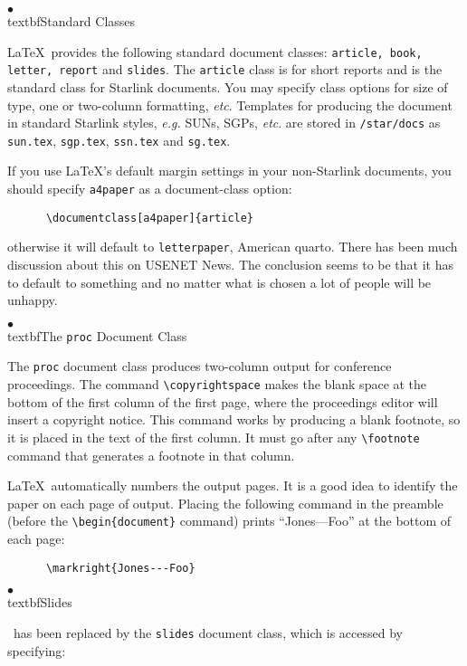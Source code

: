 \documentclass[11pt,twoside]{article}
\begin{document}
$\bullet$ \\textbf{Standard Classes}

\LaTeX\ provides the following standard document classes:
\texttt{article, book, letter, report} and \texttt{slides}.
The \texttt{article} class is for short reports and is the standard class
for Starlink documents.
You may specify class options for size of type, one or two-column formatting,
\emph{etc}.
Templates for producing the document in standard Starlink styles,
{\em e.g.} SUNs, SGPs, \emph{etc}. are stored in
\verb+/star/docs+ as \verb+sun.tex+, \verb+sgp.tex+, \verb+ssn.tex+ and
\verb+sg.tex+.

If you use \LaTeX's default margin settings in your non-Starlink documents,
you should specify \texttt{a4paper} as a document-class option:
\begin{verbatim}
      \documentclass[a4paper]{article}
\end{verbatim}
otherwise it will default to \texttt{letterpaper}, American quarto.
There has been much discussion about this on USENET News.
The conclusion seems to be that it has to default to
something and no matter what is chosen a lot of people will be unhappy.

$\bullet$ \\textbf{The \texttt{proc} Document Class}

The \texttt{proc} document class produces two-column output for conference
proceedings.  The command \hbox{\verb|\copyrightspace|} makes the blank
space at the bottom of the first column of the first page, where the
proceedings editor will insert a copyright notice.  This command works
by producing a blank footnote, so it is placed in the text of the first
column.  It must go after any \hbox{\verb|\footnote|} command that
generates a footnote in that column.

\LaTeX\ automatically numbers the output pages.  It is a good idea
to identify the paper on each page of output.  Placing the following command
in the preamble (before the \hbox{\verb|\begin{document}|} command)
prints ``Jones---Foo'' at the bottom of each page:

\begin{verbatim}
      \markright{Jones---Foo}
\end{verbatim}

$\bullet$ \\textbf{Slides}

\SLITeX\ has been replaced by the \texttt{slides} document class,
which is accessed by specifying:
\end{document}
